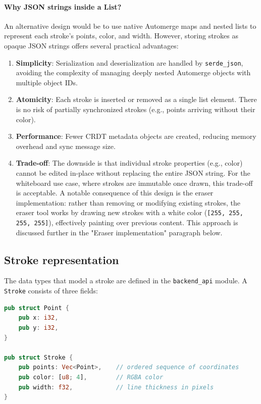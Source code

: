 \documentclass[a4paper,11pt,twoside]{report}
\theoremstyle{definition}
\begin{document}
\paragraph{Why JSON strings inside a List?}
An alternative design would be to use native Automerge maps and nested lists to represent each 
stroke's points, color, and width. However, storing strokes as opaque JSON strings offers 
several practical advantages:

\begin{enumerate}
    \item \textbf{Simplicity}: Serialization and deserialization are handled by \texttt{serde\_json}, 
    avoiding the complexity of managing deeply nested Automerge objects with multiple object IDs.
    \item \textbf{Atomicity}: Each stroke is inserted or removed as a single list element. There is 
    no risk of partially synchronized strokes (e.g., points arriving without their color).
    \item \textbf{Performance}: Fewer CRDT metadata objects are created, reducing memory overhead 
    and sync message size.
    \item \textbf{Trade-off}: The downside is that individual stroke properties (e.g., color) cannot 
    be edited in-place without replacing the entire JSON string. For the whiteboard use case, where 
    strokes are immutable once drawn, this trade-off is acceptable. A notable consequence of this 
    design is the eraser implementation: rather than removing or modifying existing strokes, the 
    eraser tool works by drawing new strokes with a white color (\texttt{[255, 255, 255, 255]}), 
    effectively painting over previous content. This approach is discussed further in the 
    "Eraser implementation" paragraph below.
\end{enumerate}

\subsection{Stroke representation}

The data types that model a stroke are defined in the \texttt{backend\_api} module. 
A \texttt{Stroke} consists of three fields:

\begin{lstlisting}[language=Rust]
pub struct Point {
    pub x: i32,
    pub y: i32,
}

pub struct Stroke {
    pub points: Vec<Point>,    // ordered sequence of coordinates
    pub color: [u8; 4],        // RGBA color
    pub width: f32,            // line thickness in pixels
}
\end{lstlisting}
\end{document}
